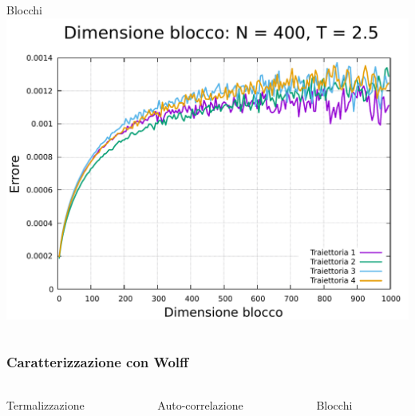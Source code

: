 \begin{frame}
\begin{columns}
\begin{column}{0.33\textwidth}
\begin{block}{Blocchi}
                \centering
                \includegraphics[width=\textwidth]{Immagini/simIsing2D/err_400_2.5.pdf}
            \end{block}        
        \end{column}
    \end{columns}
\end{frame}


\begin{frame}
    \frametitle{Caratterizzazione con Wolff}
    \framesubtitle{}

    \begin{columns}
        \begin{column}{0.33\textwidth}
            \begin{block}{Termalizzazione}
            
            \end{block}
        \end{column}
    
        \begin{column}{0.33\textwidth}
            \begin{block}{Auto-correlazione}

            \end{block}
        \end{column}

        \begin{column}{0.33\textwidth}
            \begin{block}{Blocchi}

            \end{block}        
        \end{column}
    \end{columns}
\end{frame}
